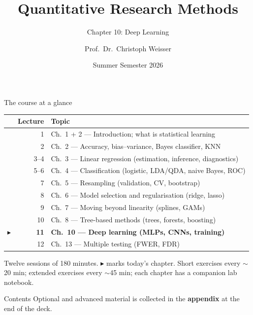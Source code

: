 \documentclass[aspectratio=169,11pt]{beamer}
\title{Quantitative Research Methods}
\subtitle{Chapter 10: Deep Learning}
\author{Prof.\ Dr.\ Christoph Weisser}\institute{HSBI}
\date{Summer Semester 2026}\graphicspath{{images/}}
\begin{document}
\begin{frame}[plain]\titlepage\end{frame}

\begin{frame}{The course at a glance}
  \footnotesize
  \begin{center}
  \begin{tabular}{@{}c r l@{}}
    & \textbf{Lecture} & \textbf{Topic}\\
    \midrule
     & 1 & Ch.\ 1 + 2 --- Introduction; what is statistical learning \\
     & 2 & Ch.\ 2 --- Accuracy, bias--variance, Bayes classifier, KNN \\
     & 3--4 & Ch.\ 3 --- Linear regression (estimation, inference, diagnostics) \\
     & 5--6 & Ch.\ 4 --- Classification (logistic, LDA/QDA, naive Bayes, ROC) \\
     & 7 & Ch.\ 5 --- Resampling (validation, CV, bootstrap) \\
     & 8 & Ch.\ 6 --- Model selection and regularisation (ridge, lasso) \\
     & 9 & Ch.\ 7 --- Moving beyond linearity (splines, GAMs) \\
     & 10 & Ch.\ 8 --- Tree-based methods (trees, forests, boosting) \\
    $\blacktriangleright$ & \textbf{11} & \textbf{Ch.\ 10 --- Deep learning (MLPs, CNNs, training)} \\
     & 12 & Ch.\ 13 --- Multiple testing (FWER, FDR) \\
  \end{tabular}
  \end{center}
  \vspace{2pt}
  {\scriptsize Twelve sessions of 180 minutes. $\blacktriangleright$ marks today's chapter. Short exercises every $\sim$20 min; extended exercises every $\sim$45 min; each chapter has a companion lab notebook.}
\end{frame}


\begin{frame}{Contents}\footnotesize\tableofcontents[hideallsubsections]
  \vfill
  {\tiny Optional and advanced material is collected in the \textbf{appendix} at the end of the deck.}
\end{frame}
\end{document}
